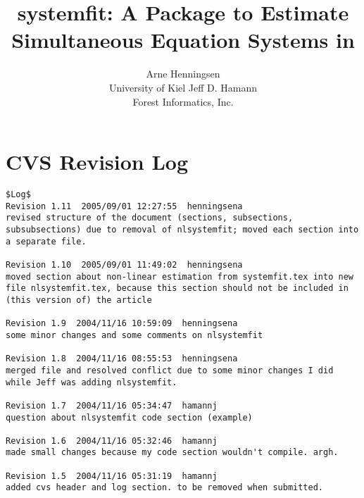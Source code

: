 \documentclass[article]{jss}
\author{Arne Henningsen\\University of Kiel\And 
        Jeff D. Hamann\\ Forest Informatics, Inc. }
\title{systemfit: A Package to Estimate\\
       Simultaneous Equation Systems in \proglang{R}}
\begin{document}








\section{CVS Revision Log}
\begin{verbatim}
$Log$
Revision 1.11  2005/09/01 12:27:55  henningsena
revised structure of the document (sections, subsections, subsubsections) due to removal of nlsystemfit; moved each section into a separate file.

Revision 1.10  2005/09/01 11:49:02  henningsena
moved section about non-linear estimation from systemfit.tex into new file nlsystemfit.tex, because this section should not be included in (this version of) the article

Revision 1.9  2004/11/16 10:59:09  henningsena
some minor changes and some comments on nlsystemfit

Revision 1.8  2004/11/16 08:55:53  henningsena
merged file and resolved conflict due to some minor changes I did while Jeff was adding nlsystemfit.

Revision 1.7  2004/11/16 05:34:47  hamannj
question about nlsystemfit code section (example)

Revision 1.6  2004/11/16 05:32:46  hamannj
made small changes because my code section wouldn't compile. argh.

Revision 1.5  2004/11/16 05:31:19  hamannj
added cvs header and log section. to be removed when submitted.

\end{verbatim}




%
\end{document}
